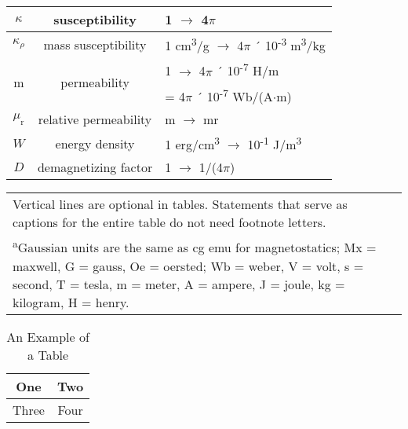 \begin{table}[!bt]
\begin{tabular}{c|c|l}
 $\kappa$  & susceptibility & 1 $\rightarrow$ 4$\pi$ \\ \hline
 $\kappa_\rho$    & mass susceptibility & 1 cm\textsuperscript{3}/g $\rightarrow$ 4$\pi$ ´ 10\textsuperscript{-3} m\textsuperscript{3}/kg \\ \hline
 \multirow{2}[0]{*}{m} & \multirow{2}[0]{*}{permeability} & 1 $\rightarrow$ 4$\pi$ ´ 10\textsuperscript{-7} H/m  \\ 
       &       &   = 4$\pi$ ´ 10\textsuperscript{-7} Wb/(A$\cdot$m) \\ \hline
 $\mu_\mathrm{r}$    & relative permeability & m $\rightarrow$ mr \\ \hline
$W$ & energy density & 1 erg/cm\textsuperscript{3} $\rightarrow$ 10\textsuperscript{-1} J/m\textsuperscript{3} \\ \hline
$D$  & demagnetizing factor & 1 $\rightarrow$ 1/(4$\pi$)\\
 \hline
 \hline
 \end{tabular}%
\newline
 \begin{tabular}{p{}}
  Vertical lines are optional in tables. Statements that serve as captions for the entire table do not need footnote letters. \\
	\textsuperscript{a}Gaussian units are the same as cg emu for magnetostatics; Mx = maxwell, G = gauss, Oe = oersted; Wb = weber, V = volt, s = second, T = tesla, m = meter, A = ampere, J = joule, kg = kilogram, H = henry.
 \end{tabular}
\end{table}






\begin{table}[!bt]
	\renewcommand{\arraystretch}{1.3}
	\caption{An Example of a Table}
	\label{tab:table_example}
	\vspace{-2ex}
	\centering
	\begin{tabular}{c|c}
		\hline
		\hline
		One & Two\\
		\hline
		Three & Four\\
		\hline
		\hline
	\end{tabular}
\end{table}



